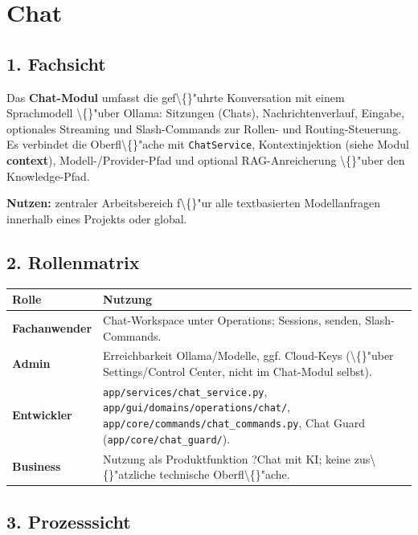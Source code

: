 \section{Chat}

\subsection{1. Fachsicht}

Das \textbf{Chat-Modul} umfasst die gef\textbackslash\{\}"uhrte Konversation mit einem Sprachmodell \textbackslash\{\}"uber Ollama: Sitzungen (Chats), Nachrichtenverlauf, Eingabe, optionales Streaming und Slash-Commands zur Rollen- und Routing-Steuerung. Es verbindet die Oberfl\textbackslash\{\}"ache mit \texttt{ChatService}, Kontextinjektion (siehe Modul \textbf{context}), Modell-/Provider-Pfad und optional RAG-Anreicherung \textbackslash\{\}"uber den Knowledge-Pfad.

\textbf{Nutzen:} zentraler Arbeitsbereich f\textbackslash\{\}"ur alle textbasierten Modellanfragen innerhalb eines Projekts oder global.

\subsection{2. Rollenmatrix}

\begin{center}
\begin{tabular}{ll}
\hline
Rolle & Nutzung \\
\hline
\textbf{Fachanwender} & Chat-Workspace unter Operations; Sessions, senden, Slash-Commands. \\
\textbf{Admin} & Erreichbarkeit Ollama/Modelle, ggf. Cloud-Keys (\textbackslash\{\}"uber Settings/Control Center, nicht im Chat-Modul selbst). \\
\textbf{Entwickler} & \texttt{app/services/chat\_service.py}, \texttt{app/gui/domains/operations/chat/}, \texttt{app/core/commands/chat\_commands.py}, Chat Guard (\texttt{app/core/chat\_guard/}). \\
\textbf{Business} & Nutzung als Produktfunktion ?Chat mit KI\texttt{}; keine zus\textbackslash\{\}"atzliche technische Oberfl\textbackslash\{\}"ache. \\
\hline
\end{tabular}
\end{center}

\subsection{3. Prozesssicht}

